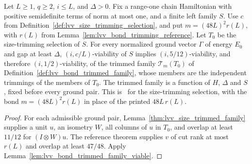 \begin{lemma}
    \label{thm:lvv_size_trimmed_family_bond_trim_set}
    \leanok
    Let $L\ge1$, $q\ge2$, $i\le L$, and $\Delta>0$. Fix a range-one chain
    Hamiltonian with positive semidefinite terms of norm at most one,
    and a finite left family $S$. Use $c$ from
    Definition~\ref{def:lvv_size_trimming_selection}, and put
    $m=(48L)^2r(L)$, with $r(L)$ from
    Lemma~\ref{lem:lvv_bond_trimming_reference}. Let $T_0$ be the
    size-trimming selection of $S$. For every normalized ground vector
    $\Gamma$ of energy $E_0$ and gap at least $\Delta$, $(i,c/L)$-viability
    of $S$ implies $(i,5/12)$-viability, and therefore $(i,1/2)$-viability, of the trimmed family
    $\mathcal T_m(T_0)$ of Definition~\ref{def:lvv_bond_trimmed_family},
    whose members are the independent trimmings of the members of $T_0$. The
    trimmed family is a function of $H$, $\Delta$ and $S$, fixed before every
    ground pair.
    This is~\cite[Claim~2.10, source lines 549--559]{Landau2015Polynomial}
    for the size-trimming selection, with the bond
    $m=(48L)^2r(L)$ in place of the printed $48L\,r(L)$.
\end{lemma}
\begin{proof}
    \leanok
    For each admissible ground pair, Lemma~\ref{thm:lvv_size_trimmed_family}
    supplies a unit $u$, an isometry $W$, all columns of $u$ in $T_0$, and
    overlap at least $11/12$ for $(I\otimes W)u$.
    The reference theorem supplies $v$ of cut rank at most $r(L)$ and
    overlap at least $47/48$. Apply
    Lemma~\ref{lem:lvv_bond_trimmed_family_viable}.
\end{proof}


